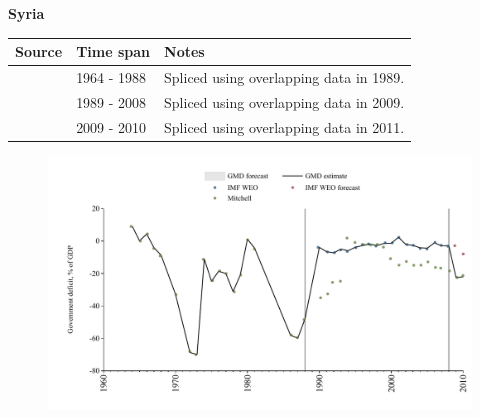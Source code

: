 \documentclass[12pt,a4paper,landscape]{article}
\begin{document}
\begin{adjustbox}{max totalsize={\paperwidth}{\paperheight},center}
\begin{minipage}[t][\textheight][t]{\textwidth}
\vspace*{0.5cm}
{}
\begin{center}
{\Large\bfseries Syria}
\end{center}
\vspace{0.5cm}
\begin{table}[H]
\centering
\small
\begin{tabular}{|l|l|l|}
\hline
\textbf{Source} & \textbf{Time span} & \textbf{Notes} \\
\hline
\rowcolor{white}\cite{Mitchell}& 1964 - 1988 &Spliced using overlapping data in 1989.\\
\rowcolor{lightgray}\cite{IMF_WEO}& 1989 - 2008 &Spliced using overlapping data in 2009.\\
\rowcolor{white}\cite{Mitchell}& 2009 - 2010 &Spliced using overlapping data in 2011.\\
\hline
\end{tabular}
\end{table}
\begin{figure}[H]
\centering
\includegraphics[width=\textwidth,height=0.6\textheight,keepaspectratio]{graphs/SYR_govdef_GDP.pdf}
\end{figure}
\end{minipage}
\end{adjustbox}
\end{document}
